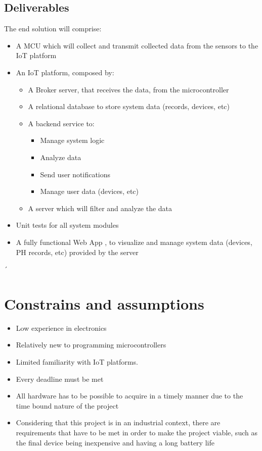 \documentclass[a4paper,twoside,11pt]{article}
\begin{document}
\subsection{Deliverables}
The end solution will comprise:
\begin{itemize}
    \item A MCU which will collect and transmit collected data from the sensors to the IoT platform
    \item An IoT platform, composed by:
    \begin{itemize}
        \item A Broker server, that receives the data, from the microcontroller
        \item A relational database to store system data (records, devices, etc) 
        \item A backend service to:
        \begin{itemize}
            \item Manage system logic
            \item Analyze data
            \item Send user notifications
            \item Manage user data (devices, etc)
        \end{itemize}
        \item A server which will filter and analyze the data
    \end{itemize}
    \item Unit tests for all system modules
    \item A fully functional Web App , to visualize and manage system data (devices, PH records, etc) provided by the server
\end{itemize}
´
\section{Constrains and assumptions}
    \begin{itemize}
        \item Low experience in electronics
        \item Relatively new to programming microcontrollers
        \item Limited familiarity with IoT platforms.
        \item Every deadline must be met
        \item All hardware has to be possible to acquire in a timely manner due to the time bound nature of the project
        \item Considering that this project is in an industrial context, there are requirements that have to be met in order to make the project viable, such as the final device being inexpensive and having a long battery life
    \end{itemize}
\end{document}

